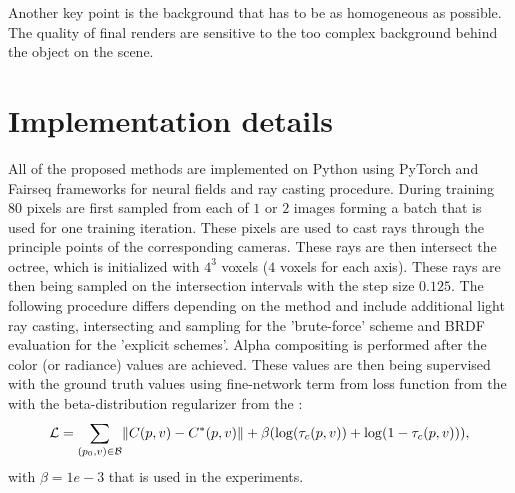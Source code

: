 Another key point is the background that has to be as homogeneous as possible.
The quality of final renders are sensitive to the too complex background behind the object on the scene.





\section{Implementation details}

All of the proposed methods are implemented on Python
using PyTorch \cite{pytorch} and Fairseq \cite{ott2019fairseq} frameworks
for neural fields and ray casting procedure.
During training $80$ pixels are first sampled from each of $1$ or $2$ images 
forming a batch that is used for one training iteration.
These pixels are used to cast rays through the principle points of the corresponding cameras.
These rays are then intersect the octree, which is initialized with $4^3$ voxels ($4$ voxels for each axis).
These rays are then being sampled on the intersection intervals with the step size $0.125$.
The following procedure differs depending on the method
and include additional light ray casting, intersecting and sampling for the 'brute-force' scheme and BRDF evaluation for the 'explicit schemes'.
Alpha compositing is performed after the color (or radiance) values are achieved.
These values are then being supervised with the ground truth values using fine-network term from loss function from the  with the beta-distribution regularizer from the :
\begin{equation}
    \mathcal{L} = \sum_{(p_0,v)\in\mathcal{B}} \norm{ C(p, v) - C^*(p, v) } + \beta(\log(\tau_c(p, v)) + \log(1 - \tau_c(p, v))),
\end{equation}
with $\beta = 1e-3$ that is used in the experiments.

